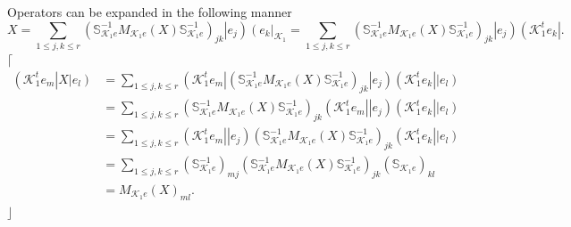 \documentclass[aps,preprint]{revtex4}%
\begin{document}
Operators can be expanded in the following manner
\begin{equation}
X=\sum_{1\leq j,k\leq r}\left(  \mathbb{S}_{\mathcal{K}_{1}e}^{-1}%
M_{\mathcal{K}_{1}e}\left(  X\right)  \mathbb{S}_{\mathcal{K}_{1}e}%
^{-1}\right)  _{jk}\left\vert e_{j}\right)  \left(  e_{k}\right\vert
_{\mathcal{K}_{1}}=\sum_{1\leq j,k\leq r}\left(  \mathbb{S}_{\mathcal{K}_{1}%
e}^{-1}M_{\mathcal{K}_{1}e}\left(  X\right)  \mathbb{S}_{\mathcal{K}_{1}%
e}^{-1}\right)  _{jk}\left\vert e_{j}\right)  \left(  \mathcal{K}_{1}^{t}%
e_{k}\right\vert .
\end{equation}
$\lceil$%
\begin{align}
\left(  \mathcal{K}_{1}^{t}e_{m}\right\vert X\left\vert e_{l}\right)   &
=\sum_{1\leq j,k\leq r}\left(  \mathcal{K}_{1}^{t}e_{m}\right\vert \left(
\mathbb{S}_{\mathcal{K}_{1}e}^{-1}M_{\mathcal{K}_{1}e}\left(  X\right)
\mathbb{S}_{\mathcal{K}_{1}e}^{-1}\right)  _{jk}\left\vert e_{j}\right)
\left(  \mathcal{K}_{1}^{t}e_{k}\right\vert \left\vert e_{l}\right) \\
&  =\sum_{1\leq j,k\leq r}\left(  \mathbb{S}_{\mathcal{K}_{1}e}^{-1}%
M_{\mathcal{K}_{1}e}\left(  X\right)  \mathbb{S}_{\mathcal{K}_{1}e}%
^{-1}\right)  _{jk}\left(  \mathcal{K}_{1}^{t}e_{m}\right\vert \left\vert
e_{j}\right)  \left(  \mathcal{K}_{1}^{t}e_{k}\right\vert \left\vert
e_{l}\right) \\
&  =\sum_{1\leq j,k\leq r}\left(  \mathcal{K}_{1}^{t}e_{m}\right\vert
\left\vert e_{j}\right)  \left(  \mathbb{S}_{\mathcal{K}_{1}e}^{-1}%
M_{\mathcal{K}_{1}e}\left(  X\right)  \mathbb{S}_{\mathcal{K}_{1}e}%
^{-1}\right)  _{jk}\left(  \mathcal{K}_{1}^{t}e_{k}\right\vert \left\vert
e_{l}\right) \\
&  =\sum_{1\leq j,k\leq r}\left(  \mathbb{S}_{\mathcal{K}_{1}e}^{-1}\right)
_{mj}\left(  \mathbb{S}_{\mathcal{K}_{1}e}^{-1}M_{\mathcal{K}_{1}e}\left(
X\right)  \mathbb{S}_{\mathcal{K}_{1}e}^{-1}\right)  _{jk}\left(
\mathbb{S}_{\mathcal{K}_{1}e}\right)  _{kl}\\
&  =M_{\mathcal{K}_{1}e}\left(  X\right)  _{ml}.
\end{align}
$\rfloor$
\end{document}
